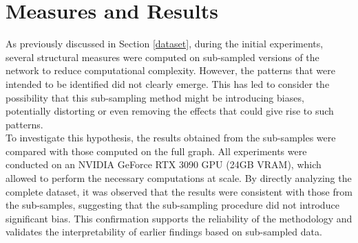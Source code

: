 \documentclass[12pt, a4paper]{article}
\begin{document}
\section{Measures and Results} \label{measures}
	As previously discussed in Section \ref{dataset}, during the initial experiments, several structural measures were computed on sub-sampled versions of the network to reduce computational complexity. However, the patterns that were intended to be identified did not clearly emerge. This has led to consider the possibility that this sub-sampling method might be introducing biases, potentially distorting or even removing the effects that could give rise to such patterns.\\
	To investigate this hypothesis, the results obtained from the sub-samples were compared with those computed on the full graph. All experiments were conducted on an NVIDIA GeForce RTX 3090 GPU (24GB VRAM), which allowed to perform the necessary computations at scale. By directly analyzing the complete dataset, it was observed that the results were consistent with those from the sub-samples, suggesting that the sub-sampling procedure did not introduce significant bias. This confirmation supports the reliability of the methodology and validates the interpretability of earlier findings based on sub-sampled data.
\end{document}
